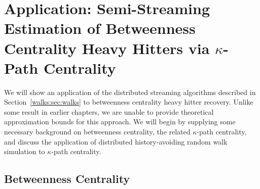 \documentclass[10]{report}
\begin{document}


\section{Application: Semi-Streaming Estimation of Betweenness Centrality Heavy Hitters via $\kappa$-Path Centrality} 
\label{sec:sskpc}

We will show an application of the distributed streaming algorithms described in Section~\ref{walks:sec:walks} to betweenness centrality heavy hitter recovery.
Unlike some result in earlier chapters, we are unable to provide theoretical approximation bounds for this approach. 
We will begin by supplying some necessary background on betweenness centrality, the related $\kappa$-path centrality, and discuss the application of distributed history-avoiding random walk simulation to $\kappa$-path centrality.

\subsection{Betweenness Centrality} 
\label{sec:bc}
\end{document}
